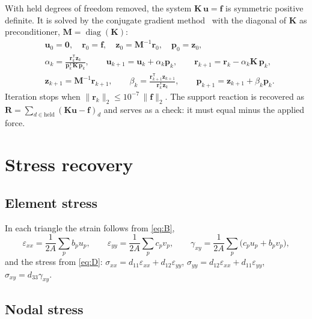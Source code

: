 \documentclass[11pt,a4paper]{article}
\newcommand{\vect}[1]{\mathbf{#1}}
\newcommand{\mat}[1]{\mathbf{#1}}
\begin{document}
With held degrees of freedom removed, the system
$\mat{K}\,\vect{u} = \vect{f}$ is symmetric positive definite. It is solved
by the conjugate gradient method~\cite{hestenes} with the diagonal of $\mat{K}$ as
preconditioner, $\mat{M} = \operatorname{diag}(\mat{K})$:
\begin{align*}
  &\vect{u}_0 = \vect{0},\quad \vect{r}_0 = \vect{f},\quad
   \vect{z}_0 = \mat{M}^{-1}\vect{r}_0,\quad \vect{p}_0 = \vect{z}_0,\\
  &\alpha_k = \frac{\vect{r}_k^{\mathsf T}\vect{z}_k}
                   {\vect{p}_k^{\mathsf T}\mat{K}\,\vect{p}_k},\qquad
   \vect{u}_{k+1} = \vect{u}_k + \alpha_k\vect{p}_k,\qquad
   \vect{r}_{k+1} = \vect{r}_k - \alpha_k\mat{K}\,\vect{p}_k,\\
  &\vect{z}_{k+1} = \mat{M}^{-1}\vect{r}_{k+1},\qquad
   \beta_k = \frac{\vect{r}_{k+1}^{\mathsf T}\vect{z}_{k+1}}
                  {\vect{r}_k^{\mathsf T}\vect{z}_k},\qquad
   \vect{p}_{k+1} = \vect{z}_{k+1} + \beta_k\vect{p}_k .
\end{align*}
Iteration stops when $\lVert\vect{r}_k\rVert_2 \le 10^{-7}\,\lVert\vect{f}\rVert_2$.
The support reaction is recovered as
$\vect{R} = \sum_{d\in\text{held}} (\mat{K}\vect{u} - \vect{f})_d$ and
serves as a check: it must equal minus the applied force.

\section{Stress recovery}

\subsection{Element stress}

In each triangle the strain follows from \eqref{eq:B},
\begin{equation}
  \varepsilon_{xx} = \frac{1}{2A}\sum_p b_p u_p,\qquad
  \varepsilon_{yy} = \frac{1}{2A}\sum_p c_p v_p,\qquad
  \gamma_{xy} = \frac{1}{2A}\sum_p \bigl(c_p u_p + b_p v_p\bigr),
\end{equation}
and the stress from \eqref{eq:D}:
$\sigma_{xx} = d_{11}\varepsilon_{xx} + d_{12}\varepsilon_{yy}$,
$\sigma_{yy} = d_{12}\varepsilon_{xx} + d_{11}\varepsilon_{yy}$,
$\sigma_{xy} = d_{33}\gamma_{xy}$.

\subsection{Nodal stress}
\end{document}
